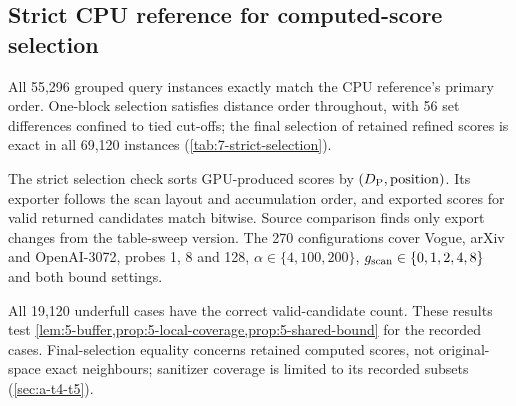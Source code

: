 \subsection{Strict CPU reference for computed-score selection}
\label{sec:7-strict-selection}

All 55,296 grouped query instances exactly match the CPU reference's
primary order. One-block selection satisfies distance order throughout,
with 56 set differences confined to tied cut-offs; the final selection
of retained refined scores is exact in all 69,120 instances
(\cref{tab:7-strict-selection}).

The strict selection check sorts GPU-produced scores by
$(D_{\mathrm{P}},\mathrm{position})$. Its exporter follows the scan layout
and accumulation order, and exported scores for valid returned candidates
match bitwise. Source comparison finds only export changes from the
table-sweep version. The 270 configurations cover Vogue, arXiv and
OpenAI-3072, probes 1, 8 and 128, $\alpha\in\{4,100,200\}$,
$g_{\mathrm{scan}}\in\{0,1,2,4,8\}$ and both bound settings.

\suppressfloats[t]
\begin{table}[!htbp]
\centering
\caption[Strict computed-score selection checks]{Strict selection checks against a CPU reference.
Set and order equality use the complete primary key. Valid count checks
$\min(c,n_c)$ survivors; final equality sorts retained computed refined
scores by $(\refineddist,\mathrm{ID})$, including their FP32 bits. Counts
are query instances, with queries reused across configurations.}
\label{tab:7-strict-selection}
\footnotesize\setlength{\tabcolsep}{3pt}

\end{table}

All 19,120 underfull cases have the correct valid-candidate count.
These results test \cref{lem:5-buffer,prop:5-local-coverage,prop:5-shared-bound}
for the recorded cases. Final-selection equality concerns retained
computed scores, not original-space exact neighbours; sanitizer coverage
is limited to its recorded subsets (\cref{sec:a-t4-t5}).
